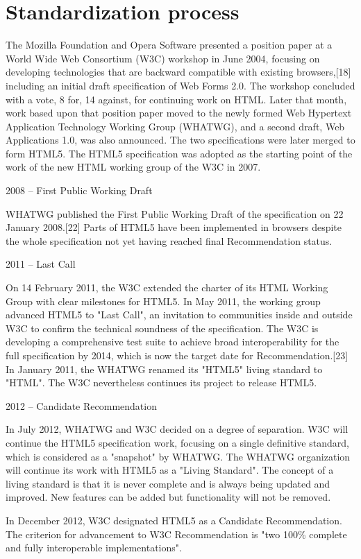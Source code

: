 \section{Standardization process}

The Mozilla Foundation and Opera Software presented a position paper at a World Wide Web Consortium (W3C) workshop in June 2004, focusing on developing technologies that are backward compatible with existing browsers,[18] including an initial draft specification of Web Forms 2.0. The workshop concluded with a vote, 8 for, 14 against, for continuing work on HTML. Later that month, work based upon that position paper moved to the newly formed Web Hypertext Application Technology Working Group (WHATWG), and a second draft, Web Applications 1.0, was also announced. The two specifications were later merged to form HTML5. The HTML5 specification was adopted as the starting point of the work of the new HTML working group of the W3C in 2007.

\begin{compactitem}
\item 2008 – First Public Working Draft

WHATWG published the First Public Working Draft of the specification on 22 January 2008.[22] Parts of HTML5 have been implemented in browsers despite the whole specification not yet having reached final Recommendation status.

\item 2011 – Last Call

On 14 February 2011, the W3C extended the charter of its HTML Working Group with clear milestones for HTML5. In May 2011, the working group advanced HTML5 to "Last Call", an invitation to communities inside and outside W3C to confirm the technical soundness of the specification. The W3C is developing a comprehensive test suite to achieve broad interoperability for the full specification by 2014, which is now the target date for Recommendation.[23] In January 2011, the WHATWG renamed its "HTML5" living standard to "HTML". The W3C nevertheless continues its project to release HTML5.

\item 2012 – Candidate Recommendation

In July 2012, WHATWG and W3C decided on a degree of separation. W3C will continue the HTML5 specification work, focusing on a single definitive standard, which is considered as a "snapshot" by WHATWG. The WHATWG organization will continue its work with HTML5 as a "Living Standard". The concept of a living standard is that it is never complete and is always being updated and improved. New features can be added but functionality will not be removed.

In December 2012, W3C designated HTML5 as a Candidate Recommendation. The criterion for advancement to W3C Recommendation is "two 100\% complete and fully interoperable implementations".

\end{compactitem}


